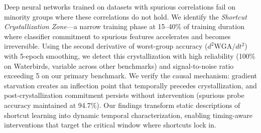Deep neural networks trained on datasets with spurious correlations fail on minority groups where these correlations do not hold. We identify the \emph{Shortcut Crystallization Zone}---a narrow training phase at 15--40\% of training duration where classifier commitment to spurious features accelerates and becomes irreversible. Using the second derivative of worst-group accuracy ($d^2\text{WGA}/dt^2$) with 5-epoch smoothing, we detect this crystallization with high reliability (100\% on Waterbirds, variable across other benchmarks) and signal-to-noise ratio exceeding 5 on our primary benchmark. We verify the causal mechanism: gradient starvation creates an inflection point that temporally precedes crystallization, and post-crystallization commitment persists without intervention (spurious probe accuracy maintained at 94.7\%). Our findings transform static descriptions of shortcut learning into dynamic temporal characterization, enabling timing-aware interventions that target the critical window where shortcuts lock in.
